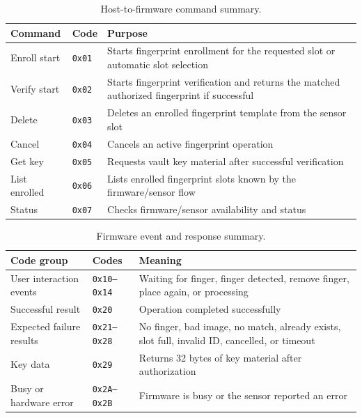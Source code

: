 \begin{table}[!htbp]
\centering
\caption{\label{tab:appendix-uart-commands}Host-to-firmware command summary.}
\begin{tabularx}{\textwidth}{lXX}
\toprule
Command & Code & Purpose\\
\midrule
Enroll start & \texttt{0x01} & Starts fingerprint enrollment for the requested slot or automatic slot selection\\
Verify start & \texttt{0x02} & Starts fingerprint verification and returns the matched authorized fingerprint if successful\\
Delete & \texttt{0x03} & Deletes an enrolled fingerprint template from the sensor slot\\
Cancel & \texttt{0x04} & Cancels an active fingerprint operation\\
Get key & \texttt{0x05} & Requests vault key material after successful verification\\
List enrolled & \texttt{0x06} & Lists enrolled fingerprint slots known by the firmware/sensor flow\\
Status & \texttt{0x07} & Checks firmware/sensor availability and status\\
\bottomrule
\end{tabularx}
\end{table}

\begin{table}[!htbp]
\centering
\caption{\label{tab:appendix-uart-responses}Firmware event and response summary.}
\small
\begin{tabularx}{\textwidth}{lXX}
\toprule
Code group & Codes & Meaning\\
\midrule
User interaction events & \texttt{0x10--0x14} & Waiting for finger, finger detected, remove finger, place again, or processing\\
Successful result & \texttt{0x20} & Operation completed successfully\\
Expected failure results & \texttt{0x21--0x28} & No finger, bad image, no match, already exists, slot full, invalid ID, cancelled, or timeout\\
Key data & \texttt{0x29} & Returns 32 bytes of key material after authorization\\
Busy or hardware error & \texttt{0x2A--0x2B} & Firmware is busy or the sensor reported an error\\
\bottomrule
\end{tabularx}
\end{table}

